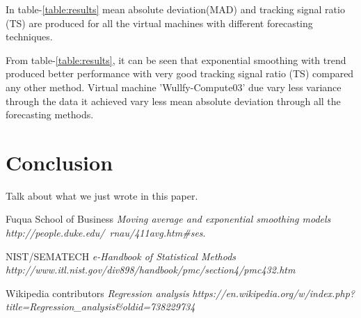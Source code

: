\documentclass[conference,onecolumn]{IEEEtran}
\begin{document}
In table-\ref{table:results} mean absolute deviation(MAD) and tracking signal ratio (TS) are produced for all the virtual machines with different forecasting techniques.

From table-\ref{table:results}, it can be seen that exponential smoothing with trend produced better performance with very good tracking signal ratio (TS) compared any other method. Virtual machine 'Wullfy-Compute03' due vary less variance through the data it achieved vary less mean absolute deviation through all the forecasting methods.

\section{Conclusion}

Talk about what we just wrote in this paper.

\ifCLASSOPTIONcaptionsoff
  \newpage
\fi



\begin{thebibliography}{1}
 Fuqua School of Business {\em Moving average and exponential smoothing models} {\em http://people.duke.edu/~rnau/411avg.htm\#ses}.

 NIST/SEMATECH {\em e-Handbook of Statistical Methods} {\em http://www.itl.nist.gov/div898/handbook/pmc/section4/pmc432.htm}

 Wikipedia contributors {\em Regression analysis} {\em https://en.wikipedia.org/w/index.php?title=Regression\_analysis\&oldid=738229734}
\end{thebibliography}
\end{document}

